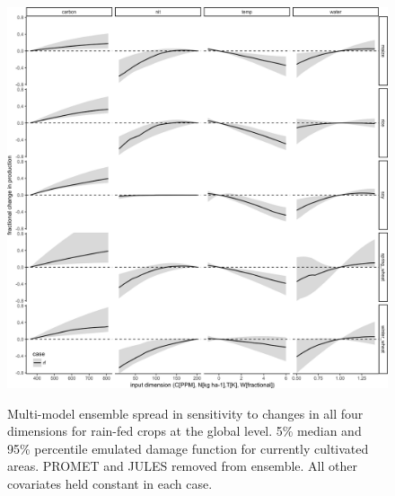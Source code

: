 \documentclass[10pt]{article}
\begin{document}
\begin{figure}[h!]
\includegraphics[width=\textwidth]{em_CTWN_all_crops.png}\\
\caption{Multi-model ensemble spread in sensitivity to changes in all four dimensions for rain-fed crops at the global level. 5\% median and 95\% percentile emulated damage function for currently cultivated areas. PROMET and JULES removed from ensemble. All other covariates held constant in each case.}
\label{fig:all_dims}
\end{figure}

\clearpage

\end{document}
